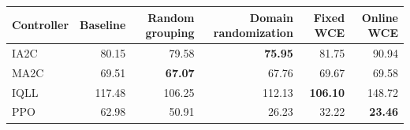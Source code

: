 \begin{tabular}{lrrrrr}
\hline
Controller & Baseline & Random grouping & Domain randomization & Fixed WCE & Online WCE \\
\hline
IA2C & 80.15 & 79.58 & \textbf{75.95} & 81.75 & 90.94 \\
MA2C & 69.51 & \textbf{67.07} & 67.76 & 69.67 & 69.58 \\
IQLL & 117.48 & 106.25 & 112.13 & \textbf{106.10} & 148.72 \\
PPO & 62.98 & 50.91 & 26.23 & 32.22 & \textbf{23.46} \\
\hline
\end{tabular}
